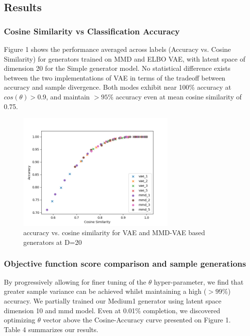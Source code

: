 \documentclass{article}
\begin{document}
\subsection {Results}
\subsubsection{Cosine Similarity vs Classification Accuracy}
Figure 1 shows the performance averaged across labels (Accuracy vs. Cosine Similarity) for generators trained on MMD and ELBO VAE, with latent space of dimension 20 for the Simple generator model. No statistical difference exists between the two implementations of VAE in terms of the tradeoff between accuracy and sample divergence. Both modes exhibit near 100\% accuracy at $cos(\theta) > 0.9$, and maintain $>95\%$ accuracy even at mean cosine similarity of 0.75. 
\begin{figure}[h]
  \centering
    \includegraphics[width=0.7\textwidth]{assets/cos_acc}
    \caption{accuracy vs. cosine similarity for VAE and MMD-VAE based generators at D=20}
\end{figure}

\subsubsection{Objective function score comparison and sample generations}

By progressively allowing for finer tuning of the $\theta$ hyper-parameter, we find that greater sample variance can be achieved whilst maintaining a high ($>99\%$) accuracy. We partially trained our Medium1 generator using latent space dimension 10 and mmd model. Even at 0.01\% completion, we discovered optimizing $\theta$ vector above the Cosine-Accuracy curve presented on Figure 1. Table 4 summarizes our results. \par
\end{document}

